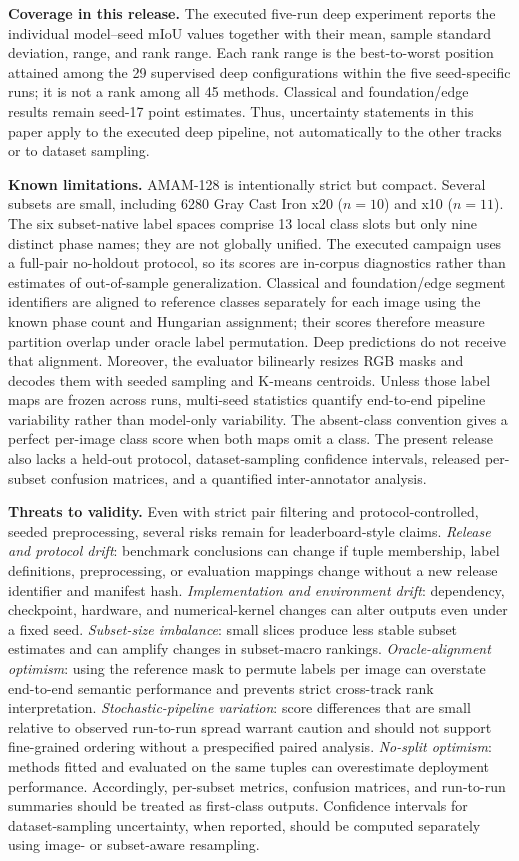 \documentclass{article}
\begin{document}
\textbf{Coverage in this release.} The executed five-run deep experiment
reports the individual model--seed mIoU values together with their mean,
sample standard deviation, range, and rank range. Each rank range is the
best-to-worst position attained among the 29 supervised deep configurations
within the five seed-specific runs; it is not a rank among all 45 methods.
Classical and
foundation/edge results remain seed-17 point estimates. Thus, uncertainty
statements in this paper apply to the executed deep pipeline, not automatically
to the other tracks or to dataset sampling.

\textbf{Known limitations.} AMAM-128 is intentionally strict but compact.
Several subsets are small, including 6280 Gray Cast Iron x20 ($n=10$) and x10
($n=11$). The six subset-native label spaces comprise 13 local class slots but
only nine distinct phase names; they are not globally unified.
The executed campaign uses a full-pair no-holdout protocol, so its scores are
in-corpus diagnostics rather than estimates of out-of-sample generalization.
Classical and foundation/edge segment identifiers are aligned to reference
classes separately for each image using the known phase count and Hungarian
assignment; their scores therefore measure partition overlap under oracle
label permutation. Deep predictions do not receive that alignment. Moreover,
the evaluator bilinearly resizes RGB masks and decodes them with seeded
sampling and K-means centroids. Unless those label maps are frozen across runs,
multi-seed statistics quantify end-to-end pipeline variability rather than
model-only variability. The absent-class convention gives a perfect
per-image class score when both maps omit a class. The present release also
lacks a held-out protocol, dataset-sampling confidence intervals, released
per-subset confusion matrices, and a quantified inter-annotator analysis.

\textbf{Threats to validity.} Even with strict pair filtering and
protocol-controlled, seeded preprocessing, several risks remain for
leaderboard-style claims. \emph{Release and protocol drift}: benchmark
conclusions can change if tuple membership, label definitions, preprocessing,
or evaluation mappings change without a new release identifier and manifest
hash. \emph{Implementation and environment drift}: dependency, checkpoint,
hardware, and numerical-kernel changes can alter outputs even under a fixed
seed. \emph{Subset-size imbalance}: small slices produce less stable subset
estimates and can amplify changes in subset-macro rankings.
\emph{Oracle-alignment optimism}: using the reference mask to permute labels
per image can overstate end-to-end semantic performance and prevents strict
cross-track rank interpretation. \emph{Stochastic-pipeline variation}: score
differences that are small relative to observed run-to-run spread warrant
caution and should not support fine-grained ordering without a prespecified
paired analysis.
\emph{No-split optimism}: methods fitted and evaluated on the same tuples can
overestimate deployment performance. Accordingly, per-subset metrics,
confusion matrices, and run-to-run summaries should be treated as first-class
outputs. Confidence intervals for
dataset-sampling uncertainty, when reported, should be computed separately
using image- or subset-aware resampling.
\end{document}
